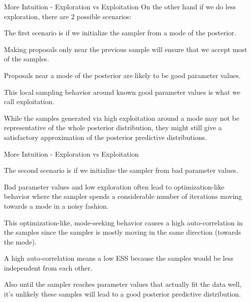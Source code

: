 \begin{frame}{More Intuition - Exploration vs Exploitation}
	On the other hand if we do less exploration, there are 2 possible scenarios:
	\begin{vfilleditems}
		\item The first scenario is if we initialize the sampler from a mode of the posterior.
		\begin{vfilleditems}
			\item Making proposals only near the previous sample will ensure that we accept most of the samples.
			\item Proposals near a mode of the posterior are likely to be good parameter values.
			\item This local sampling behavior around known good parameter values is what we call exploitation.
			\item While the samples generated via high exploitation around a mode may not be representative of the whole posterior distribution, they might still give a satisfactory approximation of the posterior predictive distributions.
		\end{vfilleditems}
	\end{vfilleditems}
\end{frame}
\begin{frame}{More Intuition - Exploration vs Exploitation}
	\begin{vfilleditems}
		\item The second scenario is if we initialize the sampler from bad parameter values.
		\begin{vfilleditems}
			\item Bad parameter values and low exploration often lead to optimization-like behavior where the sampler spends a considerable number of iterations moving towards a mode in a noisy fashion.
			\item This optimization-like, mode-seeking behavior causes a high auto-correlation in the samples since the sampler is mostly moving in the same direction (towards the mode).
			\item A high auto-correlation means a low ESS because the samples would be less independent from each other.
			\item Also until the sampler reaches parameter values that actually fit the data well, it's unlikely these samples will lead to a good posterior predictive distribution.
		\end{vfilleditems}
	\end{vfilleditems}
\end{frame}
